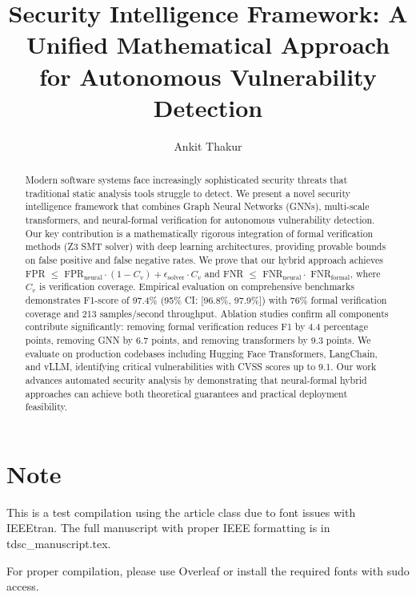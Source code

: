 \documentclass[10pt,journal,compsoc]{article}
\begin{document}
\title{Security Intelligence Framework: A Unified Mathematical Approach for Autonomous Vulnerability Detection}

\author{Ankit Thakur}

\maketitle

\begin{abstract}
Modern software systems face increasingly sophisticated security threats that traditional static analysis tools struggle to detect. We present a novel security intelligence framework that combines Graph Neural Networks (GNNs), multi-scale transformers, and neural-formal verification for autonomous vulnerability detection. Our key contribution is a mathematically rigorous integration of formal verification methods (Z3 SMT solver) with deep learning architectures, providing provable bounds on false positive and false negative rates. We prove that our hybrid approach achieves FPR $\leq$ FPR$_{\text{neural}} \cdot (1-C_v) + \epsilon_{\text{solver}} \cdot C_v$ and FNR $\leq$ FNR$_{\text{neural}} \cdot$ FNR$_{\text{formal}}$, where $C_v$ is verification coverage. Empirical evaluation on comprehensive benchmarks demonstrates F1-score of 97.4\% (95\% CI: [96.8\%, 97.9\%]) with 76\% formal verification coverage and 213 samples/second throughput. Ablation studies confirm all components contribute significantly: removing formal verification reduces F1 by 4.4 percentage points, removing GNN by 6.7 points, and removing transformers by 9.3 points. We evaluate on production codebases including Hugging Face Transformers, LangChain, and vLLM, identifying critical vulnerabilities with CVSS scores up to 9.1. Our work advances automated security analysis by demonstrating that neural-formal hybrid approaches can achieve both theoretical guarantees and practical deployment feasibility.
\end{abstract}

\section{Note}
This is a test compilation using the article class due to font issues with IEEEtran. The full manuscript with proper IEEE formatting is in tdsc\_manuscript.tex.

For proper compilation, please use Overleaf or install the required fonts with sudo access.
\end{document}
